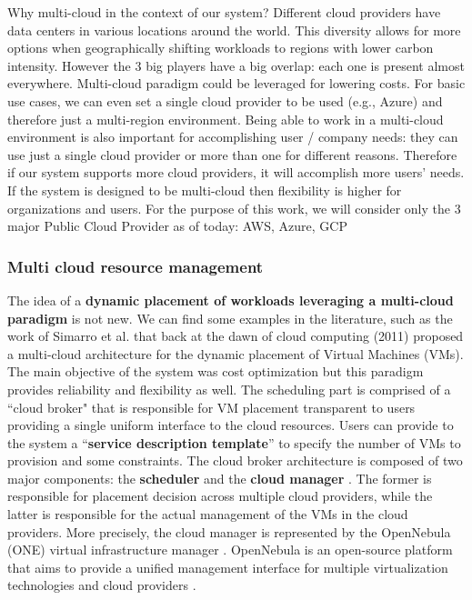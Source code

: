 Why multi-cloud in the context of our system?
Different cloud providers have data centers in various locations around the world. This diversity allows for more options when geographically shifting workloads to regions with lower carbon intensity.
However the 3 big players have a big overlap: each one is present almost everywhere.
Multi-cloud paradigm could be leveraged for lowering costs.
For basic use cases, we can even set a single cloud provider to be used (e.g., Azure) and therefore just a multi-region environment.
Being able to work in a multi-cloud environment is also important for accomplishing user / company needs: they can use just a single cloud provider or more than one for different reasons. Therefore if our system supports more cloud providers, it will accomplish more users' needs.
If the system is designed to be multi-cloud then flexibility is higher for organizations and users.
For the purpose of this work, we will consider only the 3 major Public Cloud Provider as of today: AWS, Azure, GCP


\subsubsection{Multi cloud resource management}
\label{sec:multi_cloud_resource_management}

The idea of a \textbf{dynamic placement of workloads leveraging a multi-cloud paradigm} is not new. We can find some examples in the literature, such as the work of Simarro et al. \cite{Simarro_2011} that back at the dawn of cloud computing (2011) proposed a multi-cloud architecture for the dynamic placement of Virtual Machines (VMs).
The main objective of the system was cost optimization but this paradigm provides reliability and flexibility as well.
The scheduling part is comprised of a ``cloud broker" that is responsible for VM placement transparent to users providing a single uniform interface to the cloud resources.
Users can provide to the system a ``\textbf{service description template}'' to specify the number of VMs to provision and some constraints.
The cloud broker architecture is composed of two major components: the \textbf{scheduler} and the \textbf{cloud manager} \cite{Simarro_2011}. The former is responsible for placement decision across multiple cloud providers, while the latter is responsible for the actual management of the VMs in the cloud providers. More precisely, the cloud manager is represented by the OpenNebula (ONE) virtual infrastructure manager \cite{Simarro_2011}.
OpenNebula is an open-source platform that aims to provide a unified management interface for multiple virtualization technologies and cloud providers \cite{open_nebula}.

